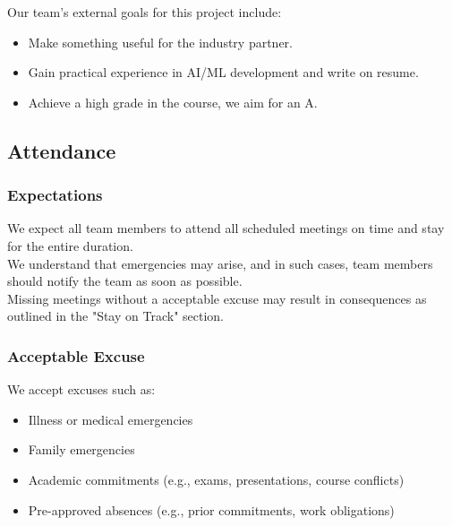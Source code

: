 \documentclass{article}
\begin{document}
\begin{enumerate}
\begin{itemize}
Our team's external goals for this project include:
\begin{itemize}
  \item Make something useful for the industry partner.
  \item Gain practical experience in AI/ML development and write on resume.
  \item Achieve a high grade in the course, we aim for an A.
\end{itemize}

\subsection*{Attendance}

\subsubsection*{Expectations}

We expect all team members to attend all scheduled meetings on time and stay for the entire duration. \\
We understand that emergencies may arise, and in such cases, team members should notify the team as soon as possible.\\
Missing meetings without a acceptable excuse may result in consequences as outlined in the "Stay on Track" section.

\subsubsection*{Acceptable Excuse}

We accept excuses such as:
\begin{itemize}
  \item Illness or medical emergencies
  \item Family emergencies
  \item Academic commitments (e.g., exams, presentations, course conflicts)
  \item Pre-approved absences (e.g., prior commitments, work obligations)
\end{itemize}


\end{itemize}
\end{enumerate}
\end{document}
